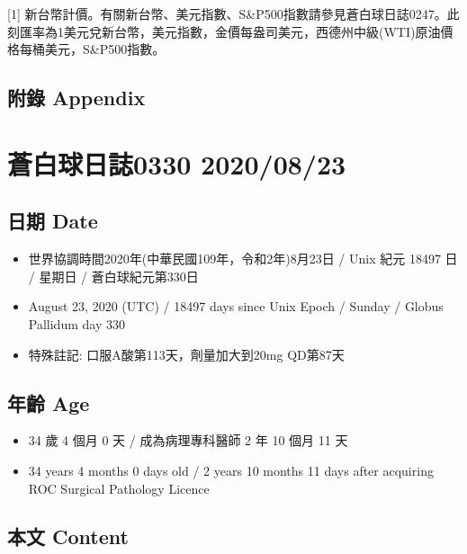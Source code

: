 \documentclass[a5paper, 11pt
]{book}
\providecommand{\tightlist}{%
  \setlength{\itemsep}{0pt}\setlength{\parskip}{0pt}}
\begin{document}
{[}1{]}
新台幣計價。有關新台幣、美元指數、S\&P500指數請參見蒼白球日誌0247。此刻匯率為1美元兌新台幣，美元指數，金價每盎司美元，西德州中級(WTI)原油價格每桶美元，S\&P500指數。

\hypertarget{ux9644ux9304-appendix-82}{%
\subsection{附錄 Appendix}\label{ux9644ux9304-appendix-82}}

\hypertarget{ux84bcux767dux7403ux65e5ux8a8c0330-20200823}{%
\section{蒼白球日誌0330
2020/08/23}\label{ux84bcux767dux7403ux65e5ux8a8c0330-20200823}}

\hypertarget{ux65e5ux671f-date-83}{%
\subsection{日期 Date}\label{ux65e5ux671f-date-83}}

\begin{itemize}
\tightlist
\item
  世界協調時間2020年(中華民國109年，令和2年)8月23日 / Unix 紀元 18497 日
  / 星期日 / 蒼白球紀元第330日
\item
  August 23, 2020 (UTC) / 18497 days since Unix Epoch / Sunday / Globus
  Pallidum day 330
\item
  特殊註記: 口服A酸第113天，劑量加大到20mg QD第87天
\end{itemize}

\hypertarget{ux5e74ux9f61-age-83}{%
\subsection{年齡 Age}\label{ux5e74ux9f61-age-83}}

\begin{itemize}
\tightlist
\item
  34 歲 4 個月 0 天 / 成為病理專科醫師 2 年 10 個月 11 天
\item
  34 years 4 months 0 days old / 2 years 10 months 11 days after
  acquiring ROC Surgical Pathology Licence
\end{itemize}

\hypertarget{ux672cux6587-content-83}{%
\subsection{本文 Content}\label{ux672cux6587-content-83}}
\end{document}
